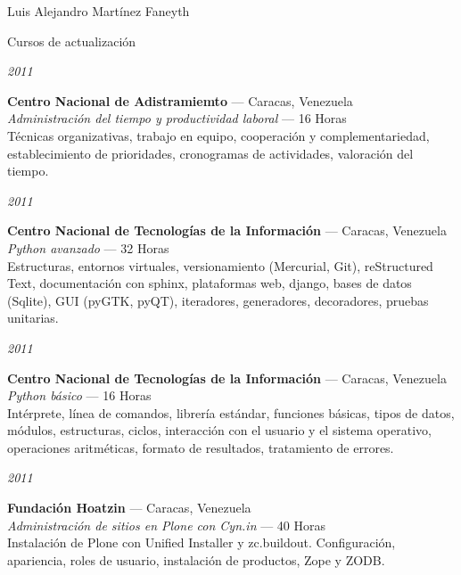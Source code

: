 \documentclass[letterpaper]{scrartcl}
\begin{document}
\begin{cv}{Luis Alejandro Mart\'inez Faneyth}
\begin{cvlist}{Cursos de actualizaci\'on}
\item[{\parbox[t]{6em}{\textit{\large{2011}}}}]{
	\parbox[t]{\linewidth}{
		\textbf{Centro Nacional de Adistramiemto} --- Caracas, Venezuela\\
		\textit{Administraci\'on del tiempo y productividad laboral} --- 16 Horas\\
		\footnotesize{T\'ecnicas organizativas, trabajo en equipo, cooperaci\'on y complementariedad, establecimiento de prioridades, cronogramas de actividades, valoraci\'on del tiempo.}
	}
}
\item[{\parbox[t]{6em}{\textit{\large{2011}}}}]{
	\parbox[t]{\linewidth}{
		\textbf{Centro Nacional de Tecnolog\'ias de la Informaci\'on} --- Caracas, Venezuela\\
		\textit{Python avanzado} --- 32 Horas\\
		\footnotesize{Estructuras, entornos virtuales, versionamiento (Mercurial, Git), reStructured Text, documentaci\'on con sphinx, plataformas web, django, bases de datos (Sqlite), GUI (pyGTK, pyQT), iteradores, generadores, decoradores, pruebas unitarias.}
	}
}
\item[{\parbox[t]{6em}{\textit{\large{2011}}}}]{
	\parbox[t]{\linewidth}{
		\textbf{Centro Nacional de Tecnolog\'ias de la Informaci\'on} --- Caracas, Venezuela\\
		\textit{Python b\'asico} --- 16 Horas\\
		\footnotesize{Int\'erprete, l\'inea de comandos, librer\'ia est\'andar, funciones b\'asicas, tipos de datos, m\'odulos, estructuras, ciclos, interacci\'on con el usuario y el sistema operativo, operaciones aritm\'eticas, formato de resultados, tratamiento de errores.}
	}
}
\item[{\parbox[t]{6em}{\textit{\large{2011}}}}]{
	\parbox[t]{\linewidth}{
		\textbf{Fundaci\'on Hoatzin} --- Caracas, Venezuela\\
		\textit{Administraci\'on de sitios en Plone con Cyn.in} --- 40 Horas\\
		\footnotesize{Instalaci\'on de Plone con Unified Installer y zc.buildout. Configuración, apariencia, roles de usuario, instalaci\'on de productos, Zope y ZODB.}
	}
}
\end{cvlist}
\vspace{1em}


\end{cv}
\end{document}

